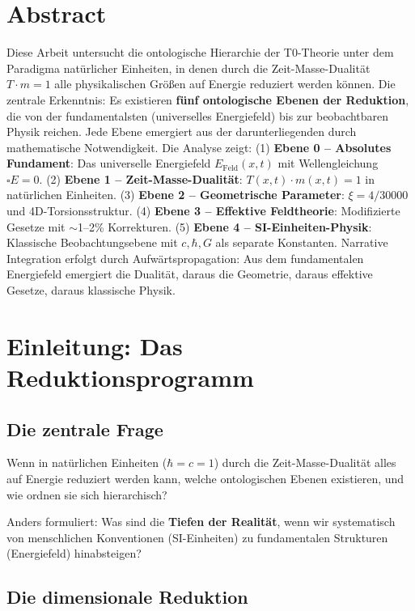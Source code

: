 \section*{Abstract}
Diese Arbeit untersucht die ontologische Hierarchie der T0-Theorie unter dem Paradigma natürlicher Einheiten, in denen durch die Zeit-Masse-Dualität $T \cdot m = 1$ alle physikalischen Größen auf Energie reduziert werden können. Die zentrale Erkenntnis: Es existieren \textbf{fünf ontologische Ebenen der Reduktion}, die von der fundamentalsten (universelles Energiefeld) bis zur beobachtbaren Physik reichen. Jede Ebene emergiert aus der darunterliegenden durch mathematische Notwendigkeit. Die Analyse zeigt: (1) \textbf{Ebene 0 -- Absolutes Fundament}: Das universelle Energiefeld $E_{\text{Feld}}(x,t)$ mit Wellengleichung $\square E = 0$. (2) \textbf{Ebene 1 -- Zeit-Masse-Dualität}: $T(x,t) \cdot m(x,t) = 1$ in natürlichen Einheiten. (3) \textbf{Ebene 2 -- Geometrische Parameter}: $\xi = 4/30000$ und 4D-Torsionsstruktur. (4) \textbf{Ebene 3 -- Effektive Feldtheorie}: Modifizierte Gesetze mit $\sim$1--2\% Korrekturen. (5) \textbf{Ebene 4 -- SI-Einheiten-Physik}: Klassische Beobachtungsebene mit $c, \hbar, G$ als separate Konstanten. Narrative Integration erfolgt durch Aufwärtspropagation: Aus dem fundamentalen Energiefeld emergiert die Dualität, daraus die Geometrie, daraus effektive Gesetze, daraus klassische Physik.




\section{Einleitung: Das Reduktionsprogramm}

\subsection{Die zentrale Frage}

\begin{important}
Wenn in natürlichen Einheiten ($\hbar = c = 1$) durch die Zeit-Masse-Dualität alles auf Energie reduziert werden kann, welche ontologischen Ebenen existieren, und wie ordnen sie sich hierarchisch?

Anders formuliert: Was sind die \textbf{Tiefen der Realität}, wenn wir systematisch von menschlichen Konventionen (SI-Einheiten) zu fundamentalen Strukturen (Energiefeld) hinabsteigen?
\end{important}

\subsection{Die dimensionale Reduktion}

